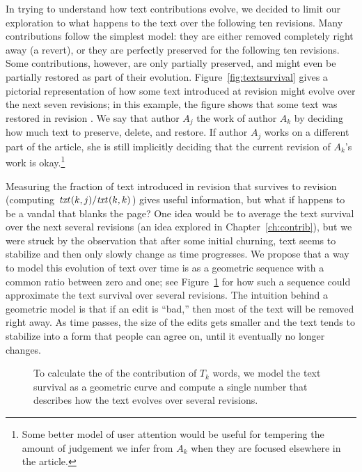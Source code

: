 In trying to understand how text contributions evolve, we decided
to limit our exploration to what happens to the text over the
following ten revisions.
Many contributions follow the simplest model: they are either
removed completely right away (a revert), or they are perfectly
preserved for the following ten revisions.
Some contributions, however, are only partially preserved, and
might even be partially restored as part of their evolution.
Figure~\ref{fig:textsurvival} gives a pictorial representation
of how some text introduced at revision  might
evolve over the next seven revisions; in this example, the
figure shows that some text was restored in revision .
We say that author $A_j$  the work of author
$A_k$ by deciding how much text to preserve, delete, and restore.
If author $A_j$ works on a different part of the article, she
is still implicitly deciding that the current revision of
$A_k$'s work is okay.\footnote{Some better model of
user attention would be useful for tempering the amount
of judgement we infer from
$A_k$ when they are focused elsewhere in the article.}

Measuring the fraction of text introduced in
revision  that survives to revision 
(\ie computing $\mathit{txt}_{}(k,j) / \mathit{txt}_{}(k,k)$)
gives useful information, but what if  happens to be
a vandal that blanks the page?
One idea would be to average the text survival over the next
several revisions (an idea explored in Chapter~\ref{ch:contrib}),
but we were struck by the observation that after some initial
churning, text seems to stabilize and then only slowly change
as time progresses.
We propose that a way to model this evolution of text over time
is as a geometric sequence with a common ratio between zero and one;
see Figure~\ref{fig:textlongevity} for how such a sequence could
approximate the text survival over several revisions.
The intuition behind a geometric model is that if an edit is
``bad,'' then most of the text will be removed right away.
As time passes, the size of the edits gets smaller and
the text tends to stabilize into a form
that people can agree on, until it eventually no longer changes.


\begin{figure}[tbph]
\centering
{}
\caption{
    To calculate the  of the contribution
    of $T_k$ words, we model the text survival as a geometric curve
    and compute a single number that describes how the text evolves
    over several revisions.}
\label{fig:textlongevity}
\end{figure}

